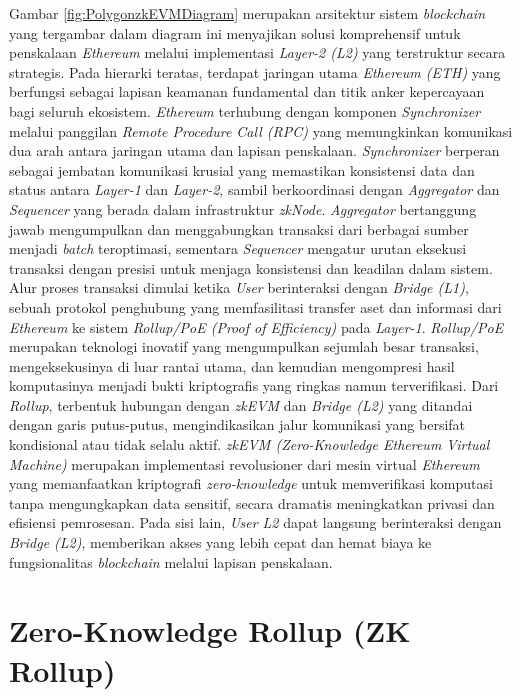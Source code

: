 Gambar \ref{fig:PolygonzkEVMDiagram} merupakan arsitektur sistem
\emph{blockchain} yang tergambar dalam diagram ini menyajikan solusi
komprehensif untuk penskalaan \emph{Ethereum} melalui implementasi
\emph{Layer-2 (L2)} yang terstruktur secara strategis. Pada hierarki teratas,
terdapat jaringan utama \emph{Ethereum (ETH)} yang berfungsi sebagai lapisan
keamanan fundamental dan titik anker kepercayaan bagi seluruh ekosistem.
\emph{Ethereum} terhubung dengan komponen \emph{Synchronizer} melalui panggilan
\emph{Remote Procedure Call (RPC)} yang memungkinkan komunikasi dua arah antara
jaringan utama dan lapisan penskalaan. \emph{Synchronizer} berperan sebagai
jembatan komunikasi krusial yang memastikan konsistensi data dan status antara
\emph{Layer-1} dan \emph{Layer-2}, sambil berkoordinasi dengan
\emph{Aggregator} dan \emph{Sequencer} yang berada dalam infrastruktur
\emph{zkNode}. \emph{Aggregator} bertanggung jawab mengumpulkan dan
menggabungkan transaksi dari berbagai sumber menjadi \emph{batch} teroptimasi,
sementara \emph{Sequencer} mengatur urutan eksekusi transaksi dengan presisi
untuk menjaga konsistensi dan keadilan dalam sistem. Alur proses transaksi
dimulai ketika \emph{User} berinteraksi dengan \emph{Bridge (L1)}, sebuah
protokol penghubung yang memfasilitasi transfer aset dan informasi dari
\emph{Ethereum} ke sistem \emph{Rollup/PoE (\emph{Proof of Efficiency})} pada
\emph{Layer-1}. \emph{Rollup/PoE} merupakan teknologi inovatif yang
mengumpulkan sejumlah besar transaksi, mengeksekusinya di luar rantai utama,
dan kemudian mengompresi hasil komputasinya menjadi bukti kriptografis yang
ringkas namun terverifikasi. Dari \emph{Rollup}, terbentuk hubungan dengan
\emph{zkEVM} dan \emph{Bridge (L2)} yang ditandai dengan garis putus-putus,
mengindikasikan jalur komunikasi yang bersifat kondisional atau tidak selalu
aktif. \emph{zkEVM (\emph{Zero-Knowledge Ethereum Virtual Machine})} merupakan
implementasi revolusioner dari mesin virtual \emph{Ethereum} yang memanfaatkan
kriptografi \emph{zero-knowledge} untuk memverifikasi komputasi tanpa
mengungkapkan data sensitif, secara dramatis meningkatkan privasi dan efisiensi
pemrosesan. Pada sisi lain, \emph{User L2} dapat langsung berinteraksi dengan
\emph{Bridge (L2)}, memberikan akses yang lebih cepat dan hemat biaya ke
fungsionalitas \emph{blockchain} melalui lapisan penskalaan.

\section{Zero-Knowledge Rollup (ZK Rollup)}
\label{sec:zkrollup}

